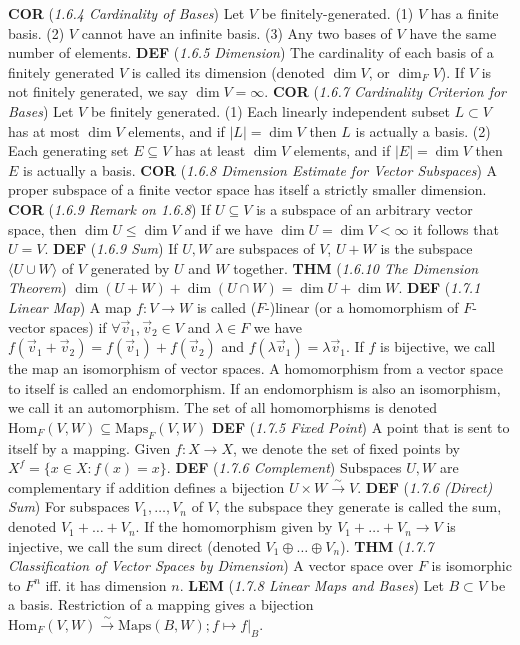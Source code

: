\documentclass{article}
\newcommand{\wde}[1]{\textcolor{defc}{\textbf{DEF}} (\textcolor{namec}{\textit{#1}})}
\newcommand{\wl}[1]{\textcolor{lemc}{\textbf{LEM}} (\textcolor{namec}{\textit{#1}})}
\newcommand{\wc}[1]{\textcolor{corc}{\textbf{COR}} (\textcolor{namec}{\textit{#1}})}
\newcommand{\wt}[1]{\textcolor{thmc}{\textbf{THM}} (\textcolor{namec}{\textit{#1}})}
\newcommand{\Maps}[0]{\text{Maps}}
\newcommand{\Hom}[0]{\text{Hom}}
\newcommand{\iso}[0]{\stackrel{\sim}{\to}}
\begin{document}
\begin{multicols}{2}
  \wc{1.6.4 Cardinality of Bases} Let $V$ be finitely-generated.
  (1) $V$ has a finite basis.
  (2) $V$ cannot have an infinite basis.
  (3) Any two bases of $V$ have the same number of elements.
  \wde{1.6.5 Dimension} The cardinality of each basis of a finitely generated $V$ is called its dimension (denoted $\dim V$, or $\dim_{F}V$). If $V$ is not finitely generated, we say $\dim V = \infty$.
  \wc{1.6.7 Cardinality Criterion for Bases} Let $V$ be finitely generated.
  (1) Each linearly independent subset $L \subset V$ has at most $\dim V$ elements, and if $|L| = \dim V$ then $L$ is actually a basis.
  (2) Each generating set $E \subseteq V$ has at least $\dim V$ elements, and if $|E| = \dim V$ then $E$ is actually a basis.
  \wc{1.6.8 Dimension Estimate for Vector Subspaces} A proper subspace of a finite vector space has itself a strictly smaller dimension.
  \wc{1.6.9 Remark on 1.6.8} If $U \subseteq V$ is a subspace of an arbitrary vector space, then $\dim U \le \dim V$ and if we have $\dim U = \dim V < \infty$ it follows that $U = V$.
  \wde{1.6.9 Sum} If $U,W$ are subspaces of $V$, $U + W$ is the subspace $\langle U \cup W \rangle$ of $V$ generated by $U$ and $W$ together.
  \wt{1.6.10 The Dimension Theorem} $\dim(U + W) + \dim(U \cap W) = \dim U + \dim W$.
  \wde{1.7.1 Linear Map} A map $f : V \to W$ is called ($F$-)linear (or a homomorphism of $F$-vector spaces) if $\forall \vec{v}_{1}, \vec{v}_{2} \in V$ and $\lambda \in F$ we have $f(\vec{v}_{1} + \vec{v}_{2}) = f(\vec{v}_{1}) + f(\vec{v}_{2})$ and $f(\lambda \vec{v}_{1}) = \lambda \vec{v}_{1}$. If $f$ is bijective, we call the map an isomorphism of vector spaces. A homomorphism from a vector space to itself is called an endomorphism. If an endomorphism is also an isomorphism, we call it an automorphism. The set of all homomorphisms is denoted $\Hom_{F}(V,W) \subseteq \Maps_{F}(V,W)$
  \wde{1.7.5 Fixed Point} A point that is sent to itself by a mapping. Given $f : X \to X$, we denote the set of fixed points by $X^{f} = \{x \in X : f(x) = x\}$.
  \wde{1.7.6 Complement} Subspaces $U,W$ are complementary if addition defines a bijection $U \times W \iso V$.
  \wde{1.7.6 (Direct) Sum} For subspaces $V_{1}, \dots, V_{n}$ of $V$, the subspace they generate is called the sum, denoted $V_{1} + \dots + V_{n}$. If the homomorphism given by $V_{1} + \dots + V_{n} \to V$ is injective, we call the sum direct (denoted $V_{1} \oplus \dots \oplus V_{n}$).
  \wt{1.7.7 Classification of Vector Spaces by Dimension} A vector space over $F$ is isomorphic to $F^{n}$ iff. it has dimension $n$.
  \wl{1.7.8 Linear Maps and Bases} Let $B \subset V$ be a basis. Restriction of a mapping gives a bijection $\Hom_{F}(V, W) \iso \Maps(B, W); f \mapsto f |_{B}$.
\end{multicols}
\end{document}
